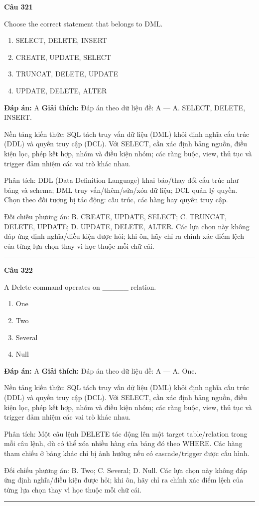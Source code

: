 \documentclass[11pt,a4paper]{article}
\newenvironment{question}[1]{%
  \par\vspace{1em}\noindent\textbf{\large Câu #1}\par\vspace{0.4em}
}{%
  \par\vspace{1em}\hrule\vspace{0.6em}
}
\newenvironment{choices}{%
  \begin{enumerate}[label=\textbf{\Alph*.},leftmargin=2.2em,itemsep=2pt,topsep=3pt]
}{%
  \end{enumerate}
}
\newcommand{\choice}{\item}
\begin{document}
\begin{question}{321}
Choose the correct statement that belongs to DML.
\begin{choices}
\choice SELECT, DELETE, INSERT
\choice CREATE, UPDATE, SELECT
\choice TRUNCAT, DELETE, UPDATE
\choice UPDATE, DELETE, ALTER
\end{choices}
\textbf{Đáp án:} A
\textbf{Giải thích:} Đáp án theo dữ liệu đề: A — A. SELECT, DELETE, INSERT.

Nền tảng kiến thức: SQL tách truy vấn dữ liệu (DML) khỏi định nghĩa cấu trúc (DDL) và quyền truy cập (DCL). Với SELECT, cần xác định bảng nguồn, điều kiện lọc, phép kết hợp, nhóm và điều kiện nhóm; các ràng buộc, view, thủ tục và trigger đảm nhiệm các vai trò khác nhau.

Phân tích: DDL (Data Definition Language) khai báo/thay đổi cấu trúc như bảng và schema; DML truy vấn/thêm/sửa/xóa dữ liệu; DCL quản lý quyền. Chọn theo đối tượng bị tác động: cấu trúc, các hàng hay quyền truy cập.

Đối chiếu phương án: B. CREATE, UPDATE, SELECT; C. TRUNCAT, DELETE, UPDATE; D. UPDATE, DELETE, ALTER. Các lựa chọn này không đáp ứng định nghĩa/điều kiện được hỏi; khi ôn, hãy chỉ ra chính xác điểm lệch của từng lựa chọn thay vì học thuộc mỗi chữ cái.
\end{question}

\begin{question}{322}
A Delete command operates on _____ relation.
\begin{choices}
\choice One
\choice Two
\choice Several
\choice Null
\end{choices}
\textbf{Đáp án:} A
\textbf{Giải thích:} Đáp án theo dữ liệu đề: A — A. One.

Nền tảng kiến thức: SQL tách truy vấn dữ liệu (DML) khỏi định nghĩa cấu trúc (DDL) và quyền truy cập (DCL). Với SELECT, cần xác định bảng nguồn, điều kiện lọc, phép kết hợp, nhóm và điều kiện nhóm; các ràng buộc, view, thủ tục và trigger đảm nhiệm các vai trò khác nhau.

Phân tích: Một câu lệnh DELETE tác động lên một target table/relation trong mỗi câu lệnh, dù có thể xóa nhiều hàng của bảng đó theo WHERE. Các hàng tham chiếu ở bảng khác chỉ bị ảnh hưởng nếu có cascade/trigger được cấu hình.

Đối chiếu phương án: B. Two; C. Several; D. Null. Các lựa chọn này không đáp ứng định nghĩa/điều kiện được hỏi; khi ôn, hãy chỉ ra chính xác điểm lệch của từng lựa chọn thay vì học thuộc mỗi chữ cái.
\end{question}
\end{document}

